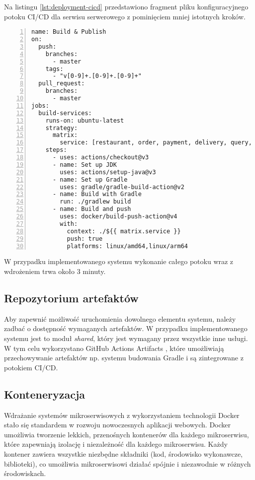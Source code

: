 Na listingu \ref{lst:deployment-cicd} przedstawiono fragment pliku konfiguracyjnego potoku CI/CD dla serwisu serwerowego z pominięciem mniej istotnych kroków.

\begin{lstlisting}[caption={Fragment potoku CI/CD},label={lst:deployment-cicd},captionpos=b,numbers=left]
name: Build & Publish
on:
  push:
    branches:
      - master
    tags:
      - "v[0-9]+.[0-9]+.[0-9]+"
  pull_request:
    branches:
      - master
jobs:
  build-services:
    runs-on: ubuntu-latest
    strategy:
      matrix:
        service: [restaurant, order, payment, delivery, query, saga]
    steps:
      - uses: actions/checkout@v3
      - name: Set up JDK
        uses: actions/setup-java@v3
      - name: Set up Gradle
        uses: gradle/gradle-build-action@v2
      - name: Build with Gradle
        run: ./gradlew build
      - name: Build and push
        uses: docker/build-push-action@v4
        with:
          context: ./${{ matrix.service }}
          push: true
          platforms: linux/amd64,linux/arm64
\end{lstlisting}

W przypadku implementowanego systemu wykonanie całego potoku wraz z wdrożeniem trwa około 3 minuty.

\subsection{Repozytorium artefaktów}

Aby zapewnić możliwość uruchomienia dowolnego elementu systemu, należy zadbać o dostępność wymaganych artefaktów. W przypadku implementowanego systemu jest to moduł \textit{shared}, który jest wymagany przez wszystkie inne usługi. W tym celu wykorzystano GitHub Actions Artifacts \cite{gaa}, które umożliwiają przechowywanie artefaktów np. systemu budowania Gradle i są zintegrowane z potokiem CI/CD.

\subsection{Konteneryzacja}

Wdrażanie systemów mikroserwisowych z wykorzystaniem technologii Docker stało się standardem w rozwoju nowoczesnych aplikacji webowych. Docker umożliwia tworzenie lekkich, przenośnych kontenerów dla każdego mikroserwisu, które zapewniają izolację i niezależność dla każdego mikroserwisu. Każdy kontener zawiera wszystkie niezbędne składniki (kod, środowisko wykonawcze, biblioteki), co umożliwia mikroserwisowi działać spójnie i niezawodnie w różnych środowiskach. 

